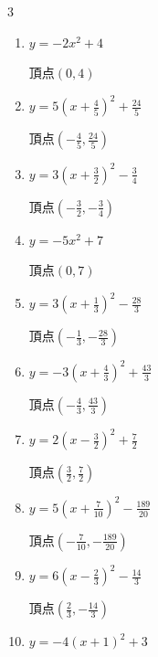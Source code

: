 \begin{multicols}{3}
\begin{enumerate}
        $\displaystyle 頂点\left( 2 , 4 \right)$

  \item $\displaystyle y=-2x^{2}+4$

        $\displaystyle 頂点\left( 0 , 4 \right)$

  \item $\displaystyle y=5\left( x+\frac{4}{5}\right)^{2}+\frac{24}{5}$

        $\displaystyle 頂点\left( -\frac{4}{5} , \frac{24}{5} \right)$

  \item $\displaystyle y=3\left( x+\frac{3}{2}\right)^{2}-\frac{3}{4}$

        $\displaystyle 頂点\left( -\frac{3}{2} , -\frac{3}{4} \right)$

  \item $\displaystyle y=-5x^{2}+7$

        $\displaystyle 頂点\left( 0 , 7 \right)$

  \item $\displaystyle y=3\left( x+\frac{1}{3}\right)^{2}-\frac{28}{3}$

        $\displaystyle 頂点\left( -\frac{1}{3} , -\frac{28}{3} \right)$

  \item $\displaystyle y=-3\left( x+\frac{4}{3}\right)^{2}+\frac{43}{3}$

        $\displaystyle 頂点\left( -\frac{4}{3} , \frac{43}{3} \right)$

\columnbreak %

\resetques

  \item $\displaystyle y=2\left( x-\frac{3}{2}\right)^{2}+\frac{7}{2}$

        $\displaystyle 頂点\left( \frac{3}{2} , \frac{7}{2} \right)$

  \item $\displaystyle y=5\left( x+\frac{7}{10}\right)^{2}-\frac{189}{20}$

        $\displaystyle 頂点\left( -\frac{7}{10} , -\frac{189}{20} \right)$

  \item $\displaystyle y=6\left( x-\frac{2}{3}\right)^{2}-\frac{14}{3}$

        $\displaystyle 頂点\left( \frac{2}{3} , -\frac{14}{3} \right)$

  \item $\displaystyle y=-4\left( x+1\right)^{2}+3$


\end{enumerate}
\end{multicols}
